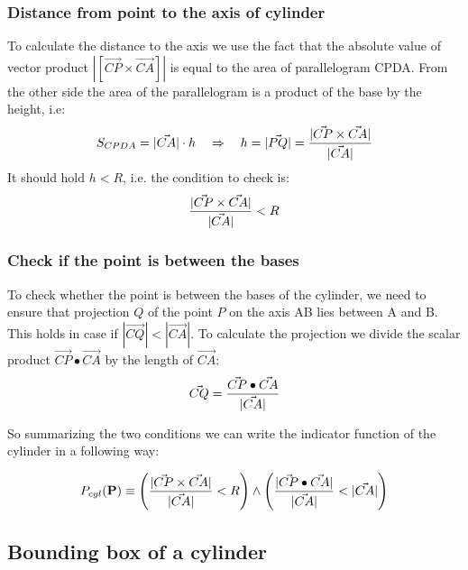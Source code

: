 \documentclass[12pt]{article}
\begin{document}
 \subsubsection*{Distance from point to the axis of cylinder}
 
    To calculate the distance to the axis we use the fact that the absolute value  of vector product $|[\vec{CP} \times \vec{CA}]|$ is equal to the area of parallelogram CPDA. 
    From the other side  the area of the parallelogram is a product of the base by the height, i.e:
    \[
     S_{CPDA} = |\vec{CA}| \cdot h ~~~ \Rightarrow ~~~ h =  |\vec{PQ}| = { | \vec{CP} \times \vec{CA} | \over |\vec{CA}| }         
   \]  
    It should hold $h<R$, i.e. the condition to check is:
 \[
   { | \vec{CP} \times \vec{CA}| \over |\vec{CA}| } < R
 \]

  \subsubsection*{Check if the point is between the bases}     
  
       To check whether the point is between the bases of the cylinder,   we need to ensure  that projection $Q$ of the point $P$ on the axis AB lies between A and B.
      This holds in case if $|\vec{CQ}| < |\vec{CA}|$.
      To calculate the projection we divide the scalar product 
      $\vec{CP} \bullet \vec{CA}$ by the length of $\vec{CA}$:
       \[
           \vec{CQ} = { \vec{CP} \bullet \vec{CA} \over |\vec{CA}| }
        \]

 So summarizing the two conditions we can write the indicator function of the cylinder in a following way:
 
 \[
    P_{cyl}(\mathbf{P}) \equiv 
      \left(  
          {|\vec{CP} \times \vec{CA}| \over |\vec{CA}|  }  < R 
     \right)
        \land
     \left(  
         { | \vec{CP} \bullet \vec{CA} | \over |\vec{CA}|  }  < |\vec{CA}| 
     \right)
 \]


\subsection{Bounding box of a cylinder}
\end{document}
